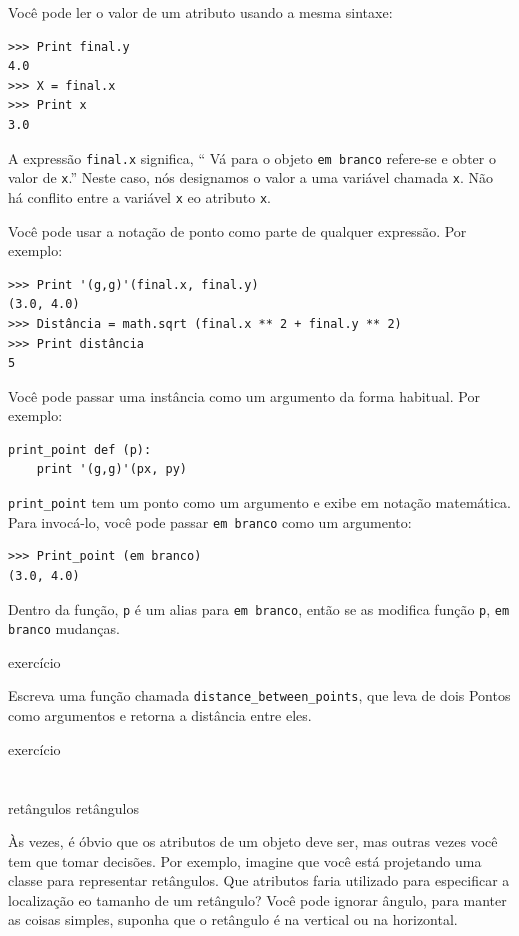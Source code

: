 \documentclass[10pt]{book}
\begin{document}
\begin{v erbatim}
{Você pode ler o valor de um atributo usando a mesma sintaxe:

\begin{verbatim}
>>> Print final.y
4.0
>>> X = final.x
>>> Print x
3.0
\end{verbatim}
%
A expressão {\tt final.x} significa, `` Vá para o objeto {\tt em branco}
refere-se e obter o valor de {\tt x}.'' Neste caso, nós designamos o
valor a uma variável chamada {\tt x}. Não há conflito entre
a variável {\tt x} eo atributo {\tt x}.

Você pode usar a notação de ponto como parte de qualquer expressão. Por exemplo:

\begin{verbatim}
>>> Print '(g,g)'(final.x, final.y)
(3.0, 4.0)
>>> Distância = math.sqrt (final.x ** 2 + final.y ** 2)
>>> Print distância
5
\end{verbatim}
%
Você pode passar uma instância como um argumento da forma habitual.
Por exemplo:

\begin{verbatim}
print_point def (p):
    print '(g,g)'(px, py)
\end{verbatim}
%
\Verb "print_point" tem um ponto como um argumento e exibe em
notação matemática. Para invocá-lo, você pode passar {\tt em branco} como
um argumento:

\begin{verbatim}
>>> Print_point (em branco)
(3.0, 4.0)
\end{verbatim}
%
Dentro da função, {\tt p} é um alias para {\tt em branco}, então se
as modifica função {\tt p}, {\tt em branco} mudanças.


\begin{} exercício

Escreva uma função chamada \verb "distance_between_points", que leva de dois
Pontos como argumentos e retorna a distância entre eles.

\end{} exercício



\section{} retângulos
\label{} retângulos

Às vezes, é óbvio que os atributos de um objeto deve ser,
mas outras vezes você tem que tomar decisões. Por exemplo, imagine que você
está projetando uma classe para representar retângulos. Que atributos faria
utilizado para especificar a localização eo tamanho de um retângulo? Você pode
ignorar ângulo, para manter as coisas simples, suponha que o retângulo é
na vertical ou na horizontal.

}
\end{v erbatim}
\end{document}
